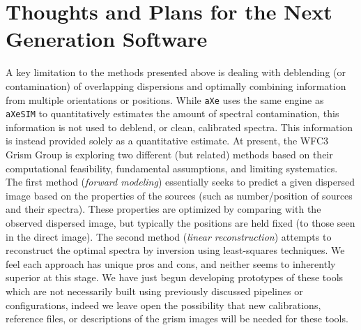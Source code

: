 \documentclass[preprint]{aastex}
\begin{document}



\section{Thoughts and Plans for the Next Generation Software}\label{sec:nextgen} 

A key limitation to the methods presented above is dealing with deblending (or contamination) of overlapping dispersions and optimally combining information from multiple orientations or positions.  
While \texttt{aXe} uses the same engine as \texttt{aXeSIM} to quantitatively estimates the amount of spectral contamination, this information is not used to deblend, or clean, calibrated spectra. This information is instead provided solely as a quantitative estimate. At present, the WFC3 Grism Group is exploring two different (but related) methods based on their computational feasibility, fundamental assumptions, and limiting systematics.  The first method ({\it forward modeling}) essentially seeks to predict a given dispersed image based on the properties of the sources (such as number/position of sources and their spectra).  These properties are optimized by comparing with the observed dispersed image, but typically the positions are held fixed (to those seen in the direct image).  The second method ({\it linear reconstruction}) attempts to reconstruct the optimal spectra by inversion using least-squares techniques.  We feel each approach has unique pros and cons, and neither seems to inherently superior at this stage.  We have just begun developing prototypes of these tools which are not necessarily built using previously discussed pipelines or configurations, indeed we leave open the possibility that new calibrations, reference files, or descriptions of the grism images will be needed for these tools.  
\end{document}

